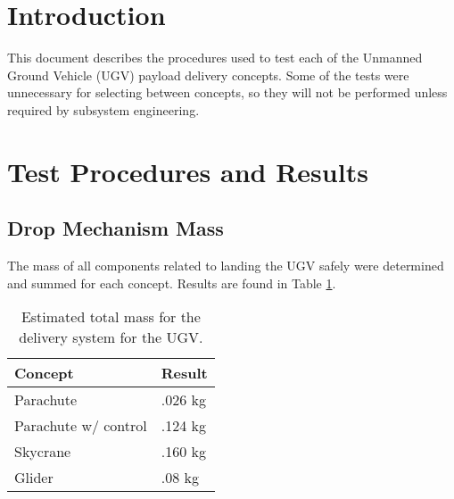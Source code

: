 \documentclass[]{auvsi_doc}
\begin{document}
\begin{AUVSITitlePage}
\begin{artifacttable}

\end{artifacttable}
\end{AUVSITitlePage}

\section{Introduction}
This document describes the procedures used to test each of the Unmanned Ground Vehicle (UGV) payload delivery concepts.
Some of the tests were unnecessary for selecting between concepts, so they will not be performed unless required by subsystem engineering.

\section {Test Procedures and Results}
	\subsection{Drop Mechanism Mass}

	The mass of all components related to landing the UGV safely were determined and summed for each concept. Results are found in Table \ref{mass}.


	\begin{table}[!h]
	\centering
	
	\caption{Estimated total mass for the delivery system for the UGV.}
\label{mass}
	\begin{tabular}{|l|l|}
		\hline
		\textbf{Concept}       & \textbf{Result} \\
		\hline
		Parachute              & .026 kg                \\
		Parachute w/ control   & .124 kg                \\
		Skycrane               & .160 kg                \\
		Glider                 & .08 kg				 \\
		\hline
	\end{tabular}
	\end{table}
\end{document}
